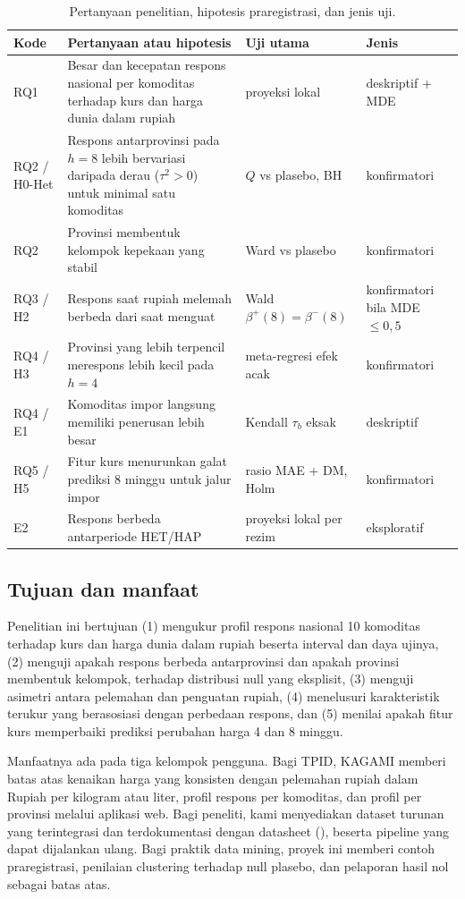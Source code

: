 \documentclass[11pt,a4paper]{article}
\makeatletter
\newcommand{\kg@one}[2]{\ifcsdef{#1@#2}{\csuse{#1@#2}}{\textbf{??#2}\PackageWarning{kagami}{Rujukan tak dikenal: #2}}}
\newcommand{\kg@item}[1]{\kg@sep\kg@one{refp}{#1}\def\kg@sep{; }}
\newcommand{\citep}[1]{\begingroup\def\kg@sep{}(\forcsvlist{\kg@item}{#1})\endgroup}
\makeatother
\begin{document}
\begin{table}[!htbp]
\centering\small
\caption{Pertanyaan penelitian, hipotesis praregistrasi, dan jenis uji.}
\label{tab:rq}
\begin{tabularx}{\textwidth}{@{}l >{\RaggedRight}X l l@{}}
\toprule
Kode & Pertanyaan atau hipotesis & Uji utama & Jenis \\
\midrule
RQ1 & Besar dan kecepatan respons nasional per komoditas terhadap kurs dan harga dunia dalam rupiah & proyeksi lokal & deskriptif + MDE \\
RQ2 / H0-Het & Respons antarprovinsi pada $h=8$ lebih bervariasi daripada derau ($\tau^2>0$) untuk minimal satu komoditas & $Q$ vs plasebo, BH & konfirmatori \\
RQ2 & Provinsi membentuk kelompok kepekaan yang stabil & Ward vs plasebo & konfirmatori \\
RQ3 / H2 & Respons saat rupiah melemah berbeda dari saat menguat & Wald $\beta^{+}(8)=\beta^{-}(8)$ & konfirmatori bila MDE $\le 0,5$ \\
RQ4 / H3 & Provinsi yang lebih terpencil merespons lebih kecil pada $h=4$ & meta-regresi efek acak & konfirmatori \\
RQ4 / E1 & Komoditas impor langsung memiliki penerusan lebih besar & Kendall $\tau_b$ eksak & deskriptif \\
RQ5 / H5 & Fitur kurs menurunkan galat prediksi 8 minggu untuk jalur impor & rasio MAE + DM, Holm & konfirmatori \\
E2 & Respons berbeda antarperiode HET/HAP & proyeksi lokal per rezim & eksploratif \\
\bottomrule
\end{tabularx}
\end{table}

\subsection{Tujuan dan manfaat}

Penelitian ini bertujuan (1) mengukur profil respons nasional 10 komoditas terhadap kurs dan harga dunia dalam rupiah beserta
interval dan daya ujinya, (2) menguji apakah respons berbeda antarprovinsi dan apakah provinsi membentuk kelompok, terhadap
distribusi null yang eksplisit, (3) menguji asimetri antara pelemahan dan penguatan rupiah, (4) menelusuri karakteristik terukur
yang berasosiasi dengan perbedaan respons, dan (5) menilai apakah fitur kurs memperbaiki prediksi perubahan harga 4 dan 8 minggu.

Manfaatnya ada pada tiga kelompok pengguna. Bagi TPID, KAGAMI memberi batas atas kenaikan harga yang konsisten dengan pelemahan
rupiah dalam Rupiah per kilogram atau liter, profil respons per komoditas, dan profil per provinsi melalui aplikasi web. Bagi
peneliti, kami menyediakan dataset turunan yang terintegrasi dan terdokumentasi dengan datasheet \citep{gebru2021}, beserta
pipeline yang dapat dijalankan ulang. Bagi praktik data mining, proyek ini memberi contoh praregistrasi, penilaian clustering
terhadap null plasebo, dan pelaporan hasil nol sebagai batas atas.
\end{document}
